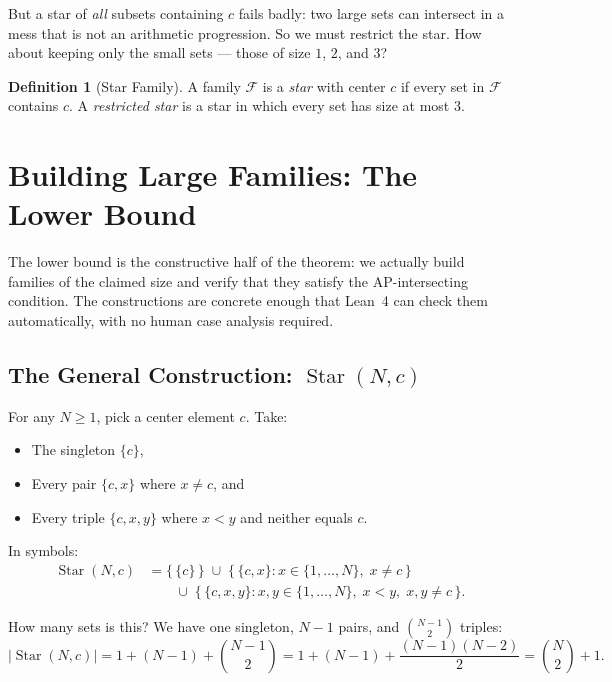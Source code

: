 \documentclass[11pt,a4paper]{article}
\theoremstyle{definition}
\newtheorem{definition}{Definition}[section]
\newcommand{\ground}{\{1,\dots,N\}}
\begin{document}
But a star of \emph{all} subsets containing $c$ fails badly: two large sets can
intersect in a mess that is not an arithmetic progression. So we must restrict the
star. How about keeping only the small sets --- those of size $1$, $2$, and $3$?

\begin{definition}[Star Family]
A family $\mathcal{F}$ is a \emph{star} with center $c$ if every set in $\mathcal{F}$
contains $c$. A \emph{restricted star} is a star in which every set has size at most
$3$.
\end{definition}


\section{Building Large Families: The Lower Bound}\label{sec:lower}

The lower bound is the constructive half of the theorem: we actually build families
of the claimed size and verify that they satisfy the AP-intersecting condition. The
constructions are concrete enough that Lean~4 can check them automatically, with no
human case analysis required.

\subsection{The General Construction: $\operatorname{Star}(N,c)$}

For any $N \geq 1$, pick a center element $c$. Take:
\begin{itemize}
    \item The singleton $\{c\}$,
    \item Every pair $\{c, x\}$ where $x \neq c$, and
    \item Every triple $\{c, x, y\}$ where $x < y$ and neither equals $c$.
\end{itemize}

In symbols:
\[
\begin{aligned}
\operatorname{Star}(N,c) &= \{\,\{c\}\,\} \;\cup\;
    \{\,\{c,x\} : x \in \ground,\; x \neq c\,\} \\
    &\qquad \cup\; \{\,\{c,x,y\} : x,y \in \ground,\; x < y,\; x,y \neq c\,\}.
\end{aligned}
\]

How many sets is this? We have one singleton, $N-1$ pairs, and $\binom{N-1}{2}$
triples:
\[
|\operatorname{Star}(N,c)| = 1 + (N-1) + \binom{N-1}{2}
    = 1 + (N-1) + \frac{(N-1)(N-2)}{2}
    = \binom{N}{2} + 1.
\]
\end{document}
